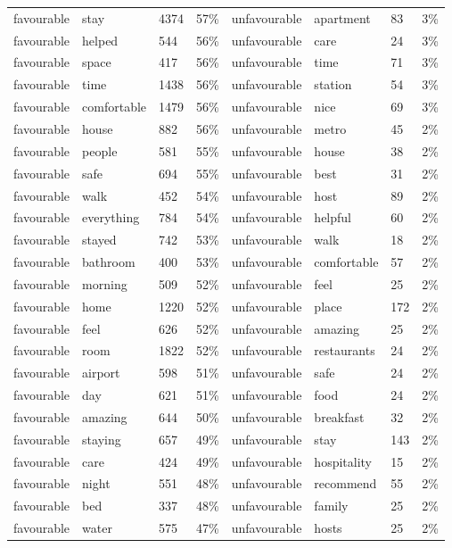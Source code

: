 \documentclass[a4paper, 12pt]{article}
\begin{document}
\begin{longtable}[l]{p{2cm}p{2cm}p{1cm}p{1.6cm}p{2.4cm}p{1.9cm}p{1cm}p{2cm}}
favourable & stay & 4374 & 57\% & unfavourable & apartment & 83 & 3\% \\
favourable & helped & 544 & 56\% & unfavourable & care & 24 & 3\% \\
favourable & space & 417 & 56\% & unfavourable & time & 71 & 3\% \\
favourable & time & 1438 & 56\% & unfavourable & station & 54 & 3\% \\
favourable & comfortable & 1479 & 56\% & unfavourable & nice & 69 & 3\% \\
favourable & house & 882 & 56\% & unfavourable & metro & 45 & 2\% \\
favourable & people & 581 & 55\% & unfavourable & house & 38 & 2\% \\
favourable & safe & 694 & 55\% & unfavourable & best & 31 & 2\% \\
favourable & walk & 452 & 54\% & unfavourable & host & 89 & 2\% \\
favourable & everything & 784 & 54\% & unfavourable & helpful & 60 & 2\% \\
favourable & stayed & 742 & 53\% & unfavourable & walk & 18 & 2\% \\
favourable & bathroom & 400 & 53\% & unfavourable & comfortable & 57 & 2\% \\
favourable & morning & 509 & 52\% & unfavourable & feel & 25 & 2\% \\
favourable & home & 1220 & 52\% & unfavourable & place & 172 & 2\% \\
favourable & feel & 626 & 52\% & unfavourable & amazing & 25 & 2\% \\
favourable & room & 1822 & 52\% & unfavourable & restaurants & 24 & 2\% \\
favourable & airport & 598 & 51\% & unfavourable & safe & 24 & 2\% \\
favourable & day & 621 & 51\% & unfavourable & food & 24 & 2\% \\
favourable & amazing & 644 & 50\% & unfavourable & breakfast & 32 & 2\% \\
favourable & staying & 657 & 49\% & unfavourable & stay & 143 & 2\% \\
favourable & care & 424 & 49\% & unfavourable & hospitality & 15 & 2\% \\
favourable & night & 551 & 48\% & unfavourable & recommend & 55 & 2\% \\
favourable & bed & 337 & 48\% & unfavourable & family & 25 & 2\% \\
favourable & water & 575 & 47\% & unfavourable & hosts & 25 & 2\% \\

\end{longtable}
\end{document}
